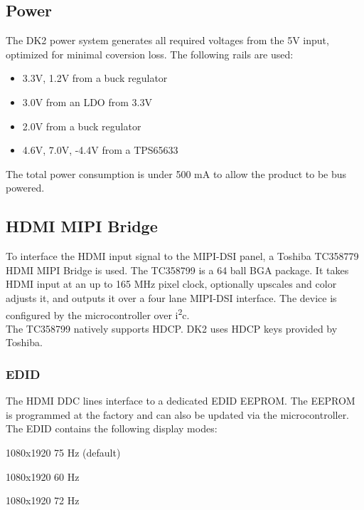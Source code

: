 \documentclass[letterpaper]{article}
\begin{document}
\subsection{Power}
The DK2 power system generates all required voltages from the 5V input, optimized for minimal coversion loss.  The following rails are used:

\begin{itemize}
    \item 3.3V, 1.2V from a buck regulator
    \item 3.0V from an LDO from 3.3V
    \item 2.0V from a buck regulator
    \item 4.6V, 7.0V, -4.4V from a TPS65633
\end{itemize}

The total power consumption is under 500 mA to allow the product to be bus powered.

\subsection{HDMI MIPI Bridge}
To interface the HDMI input signal to the MIPI-DSI panel, a Toshiba TC358779 HDMI MIPI Bridge is used.  The TC358799 is a 64 ball BGA package.  It takes HDMI input at an up to 165 MHz pixel clock, optionally upscales and color adjusts it, and outputs it over a four lane MIPI-DSI interface.  The device is configured by the microcontroller over i\textsuperscript{2}c.\\

The TC358799 natively supports HDCP.  DK2 uses HDCP keys provided by Toshiba.

\begin{center}
\end{center}

\subsubsection{EDID}
The HDMI DDC lines interface to a dedicated EDID EEPROM.  The EEPROM is programmed at the factory and can also be updated via the microcontroller.  The EDID contains the following display modes:

\begin{itemize*}
    \item 1080x1920 75 Hz (default)
    \item 1080x1920 60 Hz
    \item 1080x1920 72 Hz 
\end{itemize*}
\end{document}
